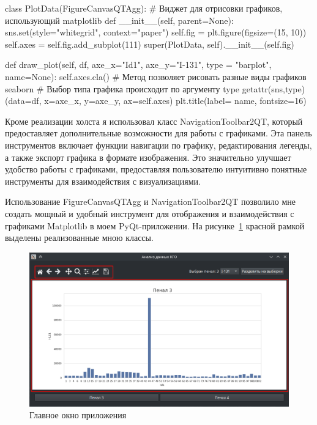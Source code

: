 \begin{flushleft}
 \label{lst:canvas}
\begin{MyCodes}
class PlotData(FigureCanvasQTAgg): 
	# Виджет для отрисовки графиков, использующий matplotlib
	def __init__(self, parent=None):
		sns.set(style="whitegrid", context="paper")
		self.fig = plt.figure(figsize=(15, 10))
		self.axes = self.fig.add_subplot(111)
		super(PlotData, self).__init__(self.fig)
	
	def draw_plot(self, df, axe_x="Id1",
			axe_y="I-131", type = "barplot", name=None):
		self.axes.cla()
		# Метод позволяет рисовать разные виды графиков seaborn
		# Выбор типа графика происходит по аргументу type
		getattr(sns,type)(data=df, x=axe_x, y=axe_y, ax=self.axes)
		plt.title(label= name, fontsize=16)
\end{MyCodes}
\end{flushleft}

Кроме реализации холста я использовал класс NavigationToolbar2QT, который предоставляет дополнительные возможности для работы с графиками. Эта панель инструментов включает функции навигации по графику, редактирования легенды, а также экспорт графика в формате изображения. Это значительно улучшает удобство работы с графиками, предоставляя пользователю интуитивно понятные инструменты для взаимодействия с визуализациями. 

Использование FigureCanvasQTAgg и NavigationToolbar2QT позволило мне создать мощный и удобный инструмент для отображения и взаимодействия с графиками Matplotlib в моем PyQt-приложении. На рисунке~\ref{fig:ris8} красной рамкой выделены реализованные мною классы.

\begin{figure}[H]
	\centering
	\includegraphics[width=1\linewidth]{pics/ris8} %
	\caption{Главное окно приложения}
	\label{fig:ris8} %
\end{figure}

